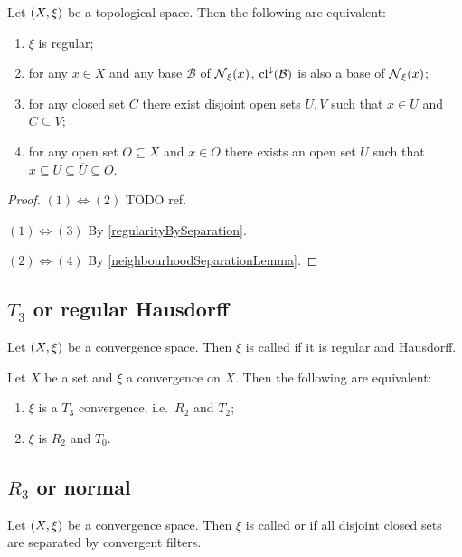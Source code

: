 \begin{proposition} \label{topologicalRegularity}
Let $\left( X,\xi \right)$ be a topological space. Then the following are equivalent:
\begin{enumerate}
\item $\xi$ is regular;
\item for any $x\in X$ and any base $\mathcal{B}$ of $\operatorname{\mathcal{N}}_\xi(x)$, $\operatorname{cl}^\downarrow(\mathcal{B})$ is also a base of $\operatorname{\mathcal{N}}_\xi(x)$;
\item for any closed set $C$ there exist disjoint open sets $U,V$ such that $x\in U$ and $C\subseteq V$;
\item for any open set $O\subseteq X$ and $x\in O$ there exists an open set $U$ such that $x\subseteq U\subseteq \overline{U} \subseteq O$.
\end{enumerate}
\end{proposition}
\begin{proof}
$(1) \Leftrightarrow (2)$ TODO ref.

$(1) \Leftrightarrow (3)$ By \ref{regularityBySeparation}.

$(2) \Leftrightarrow (4)$ By \ref{neighbourhoodSeparationLemma}.
\end{proof}

\subsection{$T_3$ or regular Hausdorff}
\begin{definition}
Let $\left( X,\xi \right)$ be a convergence space. Then $\xi$ is called  if it is regular and Hausdorff.
\end{definition}

\begin{proposition}
Let $X$ be a set and $\xi$ a convergence on $X$. Then the following are equivalent:
\begin{enumerate}
\item $\xi$ is a $T_3$ convergence, i.e.\ $R_2$ and $T_2$;
\item $\xi$ is $R_2$ and $T_0$.
\end{enumerate}
\end{proposition}

\subsection{$R_3$ or normal}
\begin{definition}
Let $\left( X,\xi \right)$ be a convergence space. Then $\xi$ is called  or  if all disjoint closed sets are separated by convergent filters.
\end{definition}

